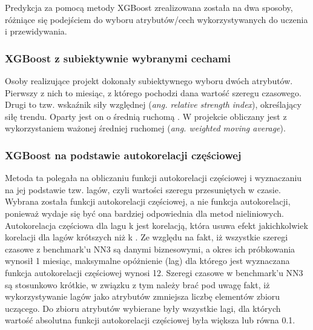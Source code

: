 \documentclass[11pt]{report}
\begin{document}
Predykcja za pomocą metody XGBoost zrealizowana została na dwa sposoby, różniące się podejściem do wyboru atrybutów/cech wykorzystywanych do uczenia i przewidywania.

\subsubsection{XGBoost z subiektywnie wybranymi cechami}
Osoby realizujące projekt dokonały subiektywnego wyboru dwóch atrybutów.
Pierwszy z nich to miesiąc, z którego pochodzi dana wartość szeregu czasowego.
Drugi to tzw. wskaźnik siły względnej (\textit{ang. relative strength index}), określający siłę trendu.
Oparty jest on o średnią ruchomą \cite{noauthor_relative_2018}.
W projekcie obliczany jest z wykorzystaniem ważonej średniej ruchomej (\textit{ang. weighted moving average}).

\subsubsection{XGBoost na podstawie autokorelacji częściowej}
Metoda ta polegała na obliczaniu funkcji autokorelacji częściowej i wyznaczaniu na jej podstawie tzw. lagów, czyli wartości szeregu przesuniętych w czasie.
Wybrana została funkcji autokorelacji częściowej, a nie funkcja autokorelacji, ponieważ wydaje się być ona bardziej odpowiednia dla metod nieliniowych.
Autokorelacja częściowa dla lagu k jest korelacją, która usuwa efekt jakichkolwiek korelacji dla lagów krótszych niż k \cite{cowpertwait_introductory_2009}.
Ze względu na fakt, iż wszystkie szeregi czasowe z benchmark'u NN3 są danymi biznesowymi, a okres ich próbkowania wynosił 1 miesiąc, maksymalne opóżnienie (lag) dla którego jest wyznaczana funkcja autokorelacji częściowej wynosi 12.
Szeregi czasowe w benchmark'u NN3 są stosunkowo krótkie, w związku z tym należy brać pod uwagę fakt, iż wykorzystywanie lagów jako atrybutów zmniejsza liczbę elementów zbioru uczącego.
Do zbioru atrybutów wybierane były wszystkie lagi, dla których wartość absolutna funkcji autokorelacji częściowej była większa lub równa 0.1.
\end{document}
